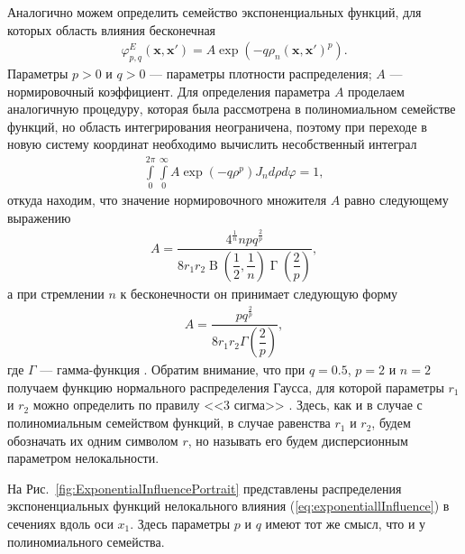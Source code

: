 Аналогично можем определить семейство экспоненциальных функций, для которых область влияния бесконечная
\begin{gather}
	\label{eq:exponentiallInfluence}
	\varphi_{p,q}^{E} (\boldsymbol{x}, \boldsymbol{x}') =
	A \exp \left(-q\rho_n(\boldsymbol{x}, \boldsymbol{x}')^p \right).
\end{gather}
Параметры $p > 0$ и $q > 0$ --- параметры плотности распределения; $A$ --- нормировочный коэффициент. Для определения параметра $A$ проделаем аналогичную процедуру, которая была рассмотрена в полиномиальном семействе функций, но область интегрирования неограничена, поэтому при переходе в новую систему координат необходимо вычислить несобственный интеграл
\begin{gather*}
	\int\limits_0^{2\pi}
		\int\limits_0^{\infty}
			A \exp \left(-q\rho^p \right) J_n
		d \rho
	d \varphi = 1,
\end{gather*}
откуда находим, что значение нормировочного множителя $A$ равно следующему выражению
\begin{gather*}
	\label{eq:normExp}
	A = 
	\dfrac
	{
		4^{\frac{1}{n}} n p q^{\frac{2}{p}}
	}
	{
		8 r_1 r_2 \operatorname{B} \left( \dfrac{1}{2}, \dfrac{1}{n} \right) \operatorname{\Gamma} \left( \dfrac{2}{p} \right)
	},
\end{gather*}
а при стремлении $n$ к бесконечности он принимает следующую форму
\begin{gather*}
	A = \dfrac{p q^{\frac{2}{p}}}{8 r_1 r_2 \Gamma \left( \dfrac{2}{p} \right)},
\end{gather*}
где $\Gamma$ --- гамма-функция \cite{SpecialFunction}. Обратим внимание, что при $q = 0.5$, $p = 2$ и $n = 2$ получаем функцию нормального распределения Гаусса, для которой параметры $r_1$ и $r_2$ можно определить по правилу <<3 сигма>> \cite{TeorVer}. Здесь, как и в случае с полиномиальным семейством функций, в случае равенства $r_1$ и $r_2$, будем обозначать их одним символом $r$, но называть его будем дисперсионным параметром нелокальности.

На Рис.~\ref{fig:ExponentialInfluencePortrait} представлены распределения экспоненциальных функций нелокального влияния (\ref{eq:exponentiallInfluence}) в сечениях вдоль оси $x_1$. Здесь параметры $p$ и $q$ имеют тот же смысл, что и у полиномиального семейства.

